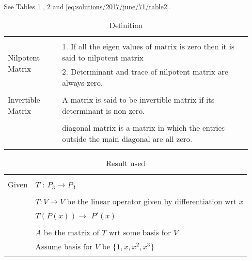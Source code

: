 See Tables \ref{eq:solutions/2017/june/71/table0}
, \ref{eq:solutions/2017/june/71/table1}
and \ref{eq:solutions/2017/june/71/table2}.

%
\onecolumn
%
\begin{longtable}{|l|l|}
\hline
\multirow{3}{*}{Nilpotent Matrix} 
& \\
& 1. If  all the eigen values of matrix is zero then it is said to nilpotent matrix \\
& 
2. Determinant and trace of nilpotent matrix are always zero.\\
\hline
\multirow{3}{*}{Invertible Matrix } & \\
&
A matrix is said to be invertible matrix if its determinant is non zero.\\
\hline
\multirow{3}{*}{Diagonal matrix} & \\
&
diagonal matrix is a matrix in which the entries outside the main diagonal are all zero.\\
\hline
\caption{Definition}
\label{eq:solutions/2017/june/71/table0}
\end{longtable}
\begin{longtable}{|l|l|}
\hline
\multirow{3}{*}{Given       } &\\
& $T$ : $P_3 \xrightarrow{} P_3$ \\ 
& \\
& $T:V\xrightarrow{}V$ be the linear operator given by differentiation wrt $x$\\
& $T(P(x)) \xrightarrow{}$ $P'(x)$ \\
& \\
& $A$ be the matrix of $T$ wrt some basis for $V$ \\
& Assume basis for $V$ be $\{1,x,x^2,x^3\}$ \\
\hline
\caption{Result used}
\label{eq:solutions/2017/june/71/table1}
\end{longtable}
